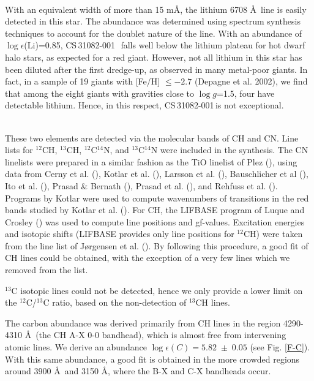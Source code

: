 \documentclass{aa}
\def\cs{CS\,31082-001\,}
\begin{document}
\\
With an equivalent width of more than 15 m\AA, the lithium 6708 \AA\ line is 
easily detected in this star. The abundance was determined using spectrum
synthesis techniques to account for the doublet nature of the line.  With an
abundance of $\log \epsilon$(Li)=0.85, \cs\, falls well below the lithium 
plateau for hot dwarf halo stars, as expected for a red giant. However,
not all lithium in this star has been diluted after the first dredge-up, as
observed in many metal-poor giants. In fact, in a sample of 19 giants with
[Fe/H] $\leq -2.7$ (Depagne et al. 2002), we find that among the
eight giants with gravities close to $\log g$=1.5, four have detectable
lithium.  Hence, in this respect, \cs is not exceptional.

\\
These two elements are detected via the molecular bands of CH and CN.  Line
lists for $^{12}$CH, $^{13}$CH, $^{12}$C$^{14}$N, and $^{13}$C$^{14}$N were
included in the synthesis.  The CN linelists were prepared in a similar fashion
 as the TiO linelist of Plez (\cite{pleztio}), using data from Cerny et
al. (\cite{cerny}), Kotlar et al. (\cite{kotlar}), Larsson et al.
(\cite{larsson}), Bauschlicher et al (\cite{bausch}), Ito et al. (\cite{ito}),
Prasad \& Bernath (\cite{prasada}), Prasad et al. (\cite{prasadb}), and Rehfuss
et al. (\cite{rehfuss}).  Programs by Kotlar were used to compute wavenumbers
of transitions in the red bands studied by Kotlar et al. (\cite{kotlar}).  For
CH, the LIFBASE program of Luque and Crosley (\cite{lifbase}) was used to
compute line positions and gf-values. Excitation energies and isotopic shifts
(LIFBASE provides only line positions for $^{12}$CH) were taken from the line
list of J\o rgensen et al. (\cite{jorgensen}). By following this procedure, a
good fit of CH lines could be obtained, with the exception of a very few
lines which we removed from the list.

$^{13}$C isotopic lines could not be detected, hence we only provide a lower 
limit on the $^{12}$C/$^{13}$C ratio, based on the non-detection of $^{13}$CH 
lines.

The carbon abundance was derived primarily from CH lines in the region
4290-4310 \AA\ (the CH A-X 0-0 bandhead), which is almost free from intervening
atomic lines. We derive an abundance $\log \epsilon (C)= 5.82 \; \pm
\;0.05$ (see Fig. \ref{F-C}).
With this same abundance, a good fit is obtained in the more crowded regions
around 3900 \AA\  and 3150 \AA, where the B-X and C-X bandheads occur.
\end{document}

